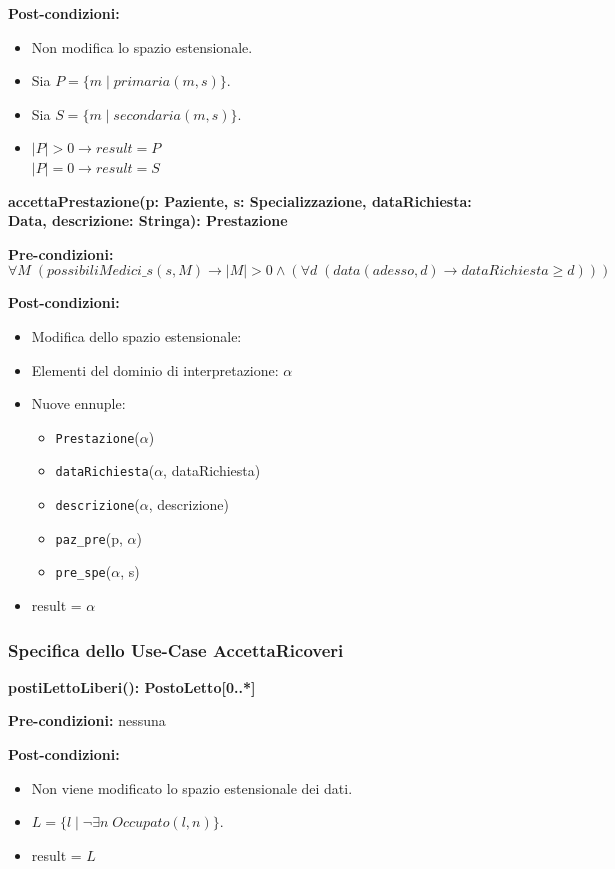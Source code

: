 \documentclass{article}
\begin{document}
\textbf{Post-condizioni:}
\begin{itemize}
    \item Non modifica lo spazio estensionale.
    \item Sia \( P = \{m \mid primaria(m,s)\} \).
    \item Sia \( S = \{m \mid secondaria(m,s)\} \).
    \item \(|P| > 0 \rightarrow result = P \) \\
    \(|P| = 0 \rightarrow result = S \)
\end{itemize}

\textbf{accettaPrestazione(p: Paziente, s: Specializzazione, dataRichiesta: Data, descrizione: Stringa): Prestazione}

\textbf{Pre-condizioni:}
\[
\forall M \; (possibiliMedici\_s(s,M) \rightarrow |M| > 0 \land (\forall d \; (data(adesso,d) \rightarrow dataRichiesta \geq d)))
\]

\textbf{Post-condizioni:}
\begin{itemize}
    \item Modifica dello spazio estensionale:
    \item Elementi del dominio di interpretazione: \( \alpha \)
    \item Nuove ennuple:
    \begin{itemize}
        \item \texttt{Prestazione}(\(\alpha\))
        \item \texttt{dataRichiesta}(\(\alpha\), dataRichiesta)
        \item \texttt{descrizione}(\(\alpha\), descrizione)
        \item \texttt{paz\_pre}(p, \(\alpha\))
        \item \texttt{pre\_spe}(\(\alpha\), s)
    \end{itemize}
    \item result = \( \alpha \)
\end{itemize}

\newpage
\subsubsection{Specifica dello Use-Case AccettaRicoveri}

\textbf{postiLettoLiberi(): PostoLetto[0..*]}

\textbf{Pre-condizioni:} nessuna

\textbf{Post-condizioni:}
\begin{itemize}
    \item Non viene modificato lo spazio estensionale dei dati.
    \item \( L = \{l \mid \neg \exists n \; Occupato(l,n)\} \).
    \item result = \( L \)
\end{itemize}
\end{document}

